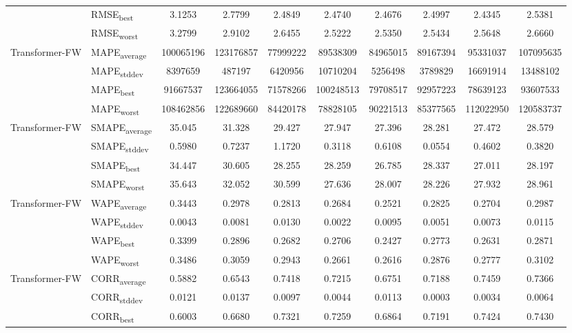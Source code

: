 {\begin{longtable}{l l c c c c c c c c}
 & RMSE\textsubscript{best} & 3.1253 & 2.7799 & 2.4849 & 2.4740 & 2.4676 & 2.4997 & 2.4345 & 2.5381 \\
 & RMSE\textsubscript{worst} & 3.2799 & 2.9102 & 2.6455 & 2.5222 & 2.5350 & 2.5434 & 2.5648 & 2.6660 \\
\cmidrule(lr){2-10}
\multirow{4}{*}{Transformer-FW} & MAPE\textsubscript{average} & 100065196 & 123176857 & 77999222 & 89538309 & 84965015 & 89167394 & 95331037 & 107095635 \\
 & MAPE\textsubscript{stddev} & 8397659 & 487197 & 6420956 & 10710204 & 5256498 & 3789829 & 16691914 & 13488102 \\
 & MAPE\textsubscript{best} & 91667537 & 123664055 & 71578266 & 100248513 & 79708517 & 92957223 & 78639123 & 93607533 \\
 & MAPE\textsubscript{worst} & 108462856 & 122689660 & 84420178 & 78828105 & 90221513 & 85377565 & 112022950 & 120583737 \\
\cmidrule(lr){2-10}
\multirow{4}{*}{Transformer-FW} & SMAPE\textsubscript{average} & 35.045 & 31.328 & 29.427 & 27.947 & 27.396 & 28.281 & 27.472 & 28.579 \\
 & SMAPE\textsubscript{stddev} & 0.5980 & 0.7237 & 1.1720 & 0.3118 & 0.6108 & 0.0554 & 0.4602 & 0.3820 \\
 & SMAPE\textsubscript{best} & 34.447 & 30.605 & 28.255 & 28.259 & 26.785 & 28.337 & 27.011 & 28.197 \\
 & SMAPE\textsubscript{worst} & 35.643 & 32.052 & 30.599 & 27.636 & 28.007 & 28.226 & 27.932 & 28.961 \\
\cmidrule(lr){2-10}
\multirow{4}{*}{Transformer-FW} & WAPE\textsubscript{average} & 0.3443 & 0.2978 & 0.2813 & 0.2684 & 0.2521 & 0.2825 & 0.2704 & 0.2987 \\
 & WAPE\textsubscript{stddev} & 0.0043 & 0.0081 & 0.0130 & 0.0022 & 0.0095 & 0.0051 & 0.0073 & 0.0115 \\
 & WAPE\textsubscript{best} & 0.3399 & 0.2896 & 0.2682 & 0.2706 & 0.2427 & 0.2773 & 0.2631 & 0.2871 \\
 & WAPE\textsubscript{worst} & 0.3486 & 0.3059 & 0.2943 & 0.2661 & 0.2616 & 0.2876 & 0.2777 & 0.3102 \\
\cmidrule(lr){2-10}
\multirow{4}{*}{Transformer-FW} & CORR\textsubscript{average} & 0.5882 & 0.6543 & 0.7418 & 0.7215 & 0.6751 & 0.7188 & 0.7459 & 0.7366 \\
 & CORR\textsubscript{stddev} & 0.0121 & 0.0137 & 0.0097 & 0.0044 & 0.0113 & 0.0003 & 0.0034 & 0.0064 \\
 & CORR\textsubscript{best} & 0.6003 & 0.6680 & 0.7321 & 0.7259 & 0.6864 & 0.7191 & 0.7424 & 0.7430 \\

\end{longtable}}
